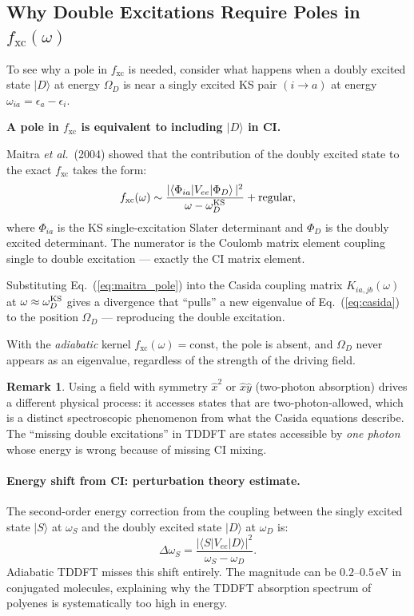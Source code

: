 \documentclass[12pt,letterpaper]{article}
\newcommand{\mel}[3]{\langle #1 \vert #2 \vert #3 \rangle}
\newcommand{\fxc}{f_{\mathrm{xc}}}
\newcommand{\etal}{\textit{et al.}}
\theoremstyle{definition}
\newtheorem{remark}{Remark}
\begin{document}
\subsection{Why Double Excitations Require Poles in $\fxc(\omega)$}

To see why a pole in $\fxc$ is needed, consider what happens when a
doubly excited state $|D\rangle$ at energy $\Omega_D$ is near a
singly excited KS pair $(i\to a)$ at energy $\omega_{ia} = \epsilon_a-\epsilon_i$.

\begin{derivbox}
\textbf{A pole in $\fxc$ is equivalent to including $|D\rangle$ in CI.}

Maitra \etal~(2004) showed that the contribution of the doubly
excited state to the exact $\fxc$ takes the form:
\begin{equation}
  \fxc(\omega) \sim \frac{|\mel{\Phi_{ia}}{V_{ee}}{\Phi_{D}}\,|^2}
                        {\omega - \omega_D^{\rm KS}}
  + \text{regular},
  \label{eq:maitra_pole}
\end{equation}
where $\Phi_{ia}$ is the KS single-excitation Slater determinant and
$\Phi_D$ is the doubly excited determinant.  The numerator is the
Coulomb matrix element coupling single to double excitation --- exactly
the CI matrix element.

Substituting Eq.~(\ref{eq:maitra_pole}) into the Casida coupling matrix
$K_{ia,jb}(\omega)$ at $\omega\approx\omega_D^{\rm KS}$ gives a
divergence that ``pulls'' a new eigenvalue of Eq.~(\ref{eq:casida})
to the position $\Omega_D$ --- reproducing the double excitation.

With the \emph{adiabatic} kernel $\fxc(\omega) = \text{const}$, the
pole is absent, and $\Omega_D$ never appears as an eigenvalue,
regardless of the strength of the driving field.
\end{derivbox}

\begin{remark}
Using a field with symmetry $\hat{x}^2$ or $\hat{x}\hat{y}$ (two-photon
absorption) drives a different physical process: it accesses states
that are two-photon-allowed, which is a distinct spectroscopic
phenomenon from what the Casida equations describe.
The ``missing double excitations'' in TDDFT are states accessible by
\emph{one photon} whose energy is wrong because of missing CI mixing.
\end{remark}

\paragraph{Energy shift from CI: perturbation theory estimate.}
The second-order energy correction from the coupling between the
singly excited state $|S\rangle$ at $\omega_S$ and the doubly excited
state $|D\rangle$ at $\omega_D$ is:
\begin{equation}
  \Delta\omega_S = \frac{|\mel{S}{V_{ee}}{D}|^2}{\omega_S - \omega_D}.
  \label{eq:2nd_order}
\end{equation}
Adiabatic TDDFT misses this shift entirely.  The magnitude can be
$0.2$--$0.5$\,eV in conjugated molecules, explaining why the
TDDFT absorption spectrum of polyenes is systematically too high in energy.
\end{document}
